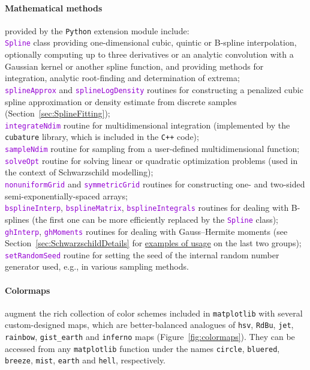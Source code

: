 \documentclass[12pt]{article}
\newcommand{\Cpp}  {\texttt{C++}\xspace}
\newcommand{\Python}{\texttt{Python}\xspace}
\newcommand{\ttt}[1]{\textcolor{darkviolet}{\texttt{#1}}}
\newcommand{\ppp}[1]{\textcolor{darkolive} {\texttt{#1}}}
\let\oldparagraph\paragraph
\renewcommand{\paragraph}[1]{\vspace{-2mm}\oldparagraph{#1}}
\begin{document}
\paragraph{Mathematical methods} provided by the \Python extension module include:\\
\ttt{Spline} class providing one-dimensional cubic, quintic or B-spline interpolation, optionally computing up to three derivatives or an analytic convolution with a Gaussian kernel or another spline function, and providing methods for integration, analytic root-finding and determination of extrema;\\
\ttt{splineApprox} and \ttt{splineLogDensity} routines for constructing a penalized cubic spline approximation or density estimate from discrete samples (Section~\ref{sec:SplineFitting});\\
\ttt{integrateNdim} routine for multidimensional integration (implemented by the \texttt{cubature} library, which is included in the \Cpp code);\\
\ttt{sampleNdim} routine for sampling from a user-defined multidimensional function;\\
\ttt{solveOpt} routine for solving linear or quadratic optimization problems (used in the context of Schwarzschild modelling);\\
\ttt{nonuniformGrid} and \ttt{symmetricGrid} routines for constructing one- and two-sided semi-exponentially-spaced arrays;\\
\ttt{bsplineInterp}, \ttt{bsplineMatrix}, \ttt{bsplineIntegrals} routines for dealing with B-splines (the first one can be more efficiently replaced by the \ttt{Spline} class);\\
\ttt{ghInterp}, \ttt{ghMoments} routines for dealing with Gauss--Hermite moments (see Section~\ref{sec:SchwarzschildDetails} for \hyperref[sec:SchwarzschildExample]{examples of usage} on the last two groups);\\
\ttt{setRandomSeed} routine for setting the seed of the internal random number generator used, e.g., in various sampling methods.

\paragraph{Colormaps} augment the rich collection of color schemes included in \texttt{matplotlib} with several custom-designed maps, which are better-balanced analogues of \texttt{hsv}, \texttt{RdBu}, \texttt{jet}, \texttt{rainbow}, \texttt{gist_earth} and \texttt{inferno} maps (Figure~\ref{fig:colormaps}). They can be accessed from any \texttt{matplotlib} function under the names \ppp{circle}, \ppp{bluered}, \ppp{breeze}, \ppp{mist}, \ppp{earth} and \ppp{hell}, respectively.
\end{document}
